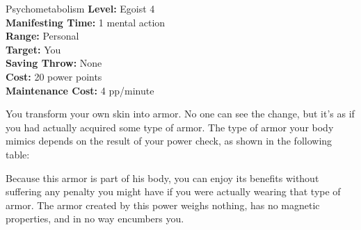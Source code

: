 {Psychometabolism}
{
	\textbf{Level:}
	Egoist 4\\
	\textbf{Manifesting Time:}
	1 mental action\\
	\textbf{Range:}
	Personal\\
	\textbf{Target:}
	You\\
	\textbf{Saving Throw:}
	None\\
	\textbf{Cost:}
	20 power points\\
	\textbf{Maintenance Cost:}
	4 pp/minute\\
}
{
	You transform your own skin into armor. No one can see the change, but it's as if you had actually acquired some type of armor. The type of armor your body mimics depends on the result of your power check, as shown in the following table:


	Because this armor is part of his body, you can enjoy its benefits without suffering any penalty you might have if you were actually wearing that type of armor. The armor created by this power weighs nothing, has no magnetic properties, and in no way encumbers you.
}